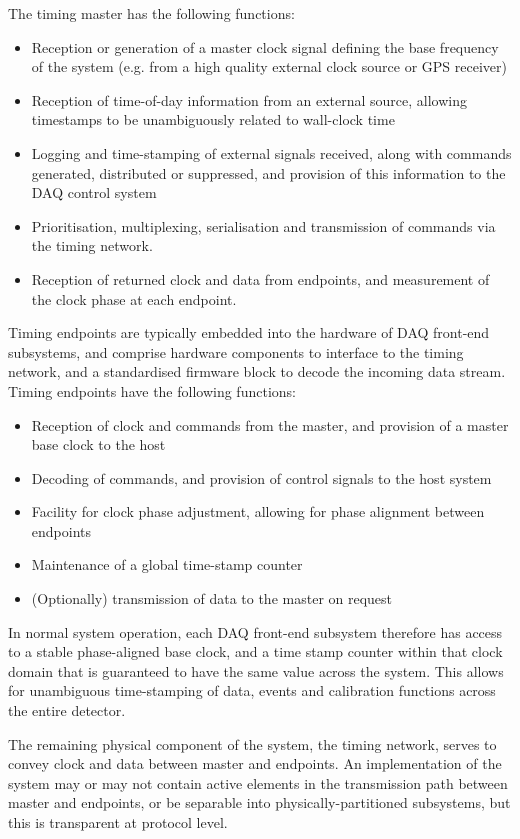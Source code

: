 \documentclass{dune}
\begin{document}
The timing master has the following functions:

\begin{itemize}
	\item Reception or generation of a master clock signal defining the base frequency of the system (e.g. from a high quality external clock source or GPS receiver)
	\item Reception of time-of-day information from an external source, allowing timestamps to be unambiguously related to wall-clock time
	\item Logging and time-stamping of external signals received, along with commands generated, distributed or suppressed, and provision of this information to the DAQ control system
	\item Prioritisation, multiplexing, serialisation and transmission of commands via the timing network.
	\item Reception of returned clock and data from endpoints, and measurement of the clock phase at each endpoint.
\end{itemize}

Timing endpoints are typically embedded into the hardware of DAQ front-end subsystems, and comprise hardware components to interface to the timing network, and a standardised firmware block to decode the incoming data stream. Timing endpoints have the following functions:

\begin{itemize}
	\item Reception of clock and commands from the master, and provision of a master base clock to the host
	\item Decoding of commands, and provision of control signals to the host system
	\item Facility for clock phase adjustment, allowing for phase alignment between endpoints
	\item Maintenance of a global time-stamp counter 
	\item (Optionally) transmission of data to the master on request
\end{itemize}

In normal system operation, each DAQ front-end subsystem therefore has access to a stable phase-aligned base clock, and a time stamp counter within that clock domain that is guaranteed to have the same value across the system. This allows for unambiguous time-stamping of data, events and calibration functions across the entire detector.

The remaining physical component of the system, the timing network, serves to convey clock and data between master and endpoints. An implementation of the system may or may not contain active elements in the transmission path between master and endpoints, or be separable into physically-partitioned subsystems, but this is transparent at protocol level.
\end{document}
